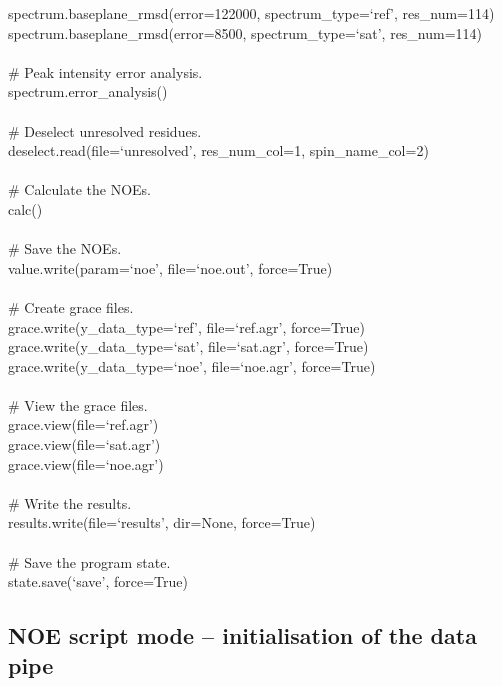 \begin{exampleenv}
spectrum.baseplane\_rmsd(error=122000, spectrum\_type=`ref', res\_num=114) \\
spectrum.baseplane\_rmsd(error=8500, spectrum\_type=`sat', res\_num=114) \\
 \\
\# Peak intensity error analysis. \\
spectrum.error\_analysis() \\
 \\
\# Deselect unresolved residues. \\
deselect.read(file=`unresolved', res\_num\_col=1, spin\_name\_col=2) \\
 \\
\# Calculate the NOEs. \\
calc() \\
 \\
\# Save the NOEs. \\
value.write(param=`noe', file=`noe.out', force=True) \\
 \\
\# Create grace files. \\
grace.write(y\_data\_type=`ref', file=`ref.agr', force=True) \\
grace.write(y\_data\_type=`sat', file=`sat.agr', force=True) \\
grace.write(y\_data\_type=`noe', file=`noe.agr', force=True) \\
 \\
\# View the grace files. \\
grace.view(file=`ref.agr') \\
grace.view(file=`sat.agr') \\
grace.view(file=`noe.agr') \\
 \\
\# Write the results. \\
results.write(file=`results', dir=None, force=True) \\
 \\
\# Save the program state. \\
state.save(`save', force=True)
\end{exampleenv}




\subsection{NOE script mode -- initialisation of the data pipe} \label{NOE initialisation}

